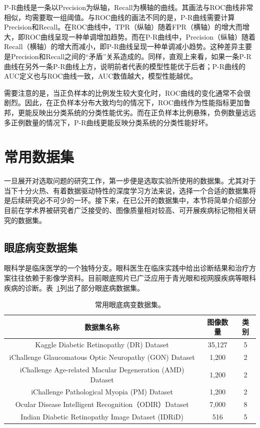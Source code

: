 P-R曲线是一条以Precision为纵轴，Recall为横轴的曲线。其画法与ROC曲线非常相似，均需要取一组阈值。与ROC曲线的画法不同的是，P-R曲线需要计算Precision和Recall。在ROC曲线中，TPR（纵轴）随着FPR（横轴）的增大而增大，即ROC曲线呈现一种单调增加趋势。而在P-R曲线中，Precision（纵轴）随着Recall（横轴）的增大而减小，即P-R曲线呈现一种单调减小趋势。这种差异主要是Precision和Recall之间的“矛盾”关系造成的。同样，直观上来看，如果一条P-R曲线在另外一条P-R曲线上方，说明前者代表的模型性能优于后者；P-R曲线的AUC定义也与ROC曲线一致，AUC数值越大，模型性能越优。

需要注意的是，当正负样本的比例发生较大变化时，ROC曲线的变化通常不会很剧烈。因此，在正负样本分布大致均匀的情况下，ROC曲线作为性能指标更加鲁邦，更能反映出分类系统的分类性能优劣。而在正负样本比例悬殊，负例数量远远多正例数量的情况下，P-R曲线更能反映分类系统的分类性能好坏。
\vspace{-0.3cm}
\section{常用数据集}\label{sec:usually_ds_intro}
一旦展开对选取问题的研究工作，第一步便是选取实验所使用的数据集。尤其对于当下十分火热、有着数据驱动特性的深度学习方法来说，选择一个合适的数据集将是后续研究必不可少的一环。接下来，在已公开的数据集中，本节将简单介绍部分目前在学术界被研究者广泛接受的、图像质量相对较高、可开展疾病标记物相关研究的数据集。

\subsection{眼底病变数据集}\label{subsec:original_dr_dataset_intro}
眼科学是临床医学的一个独特分支。眼科医生在临床实践中给出诊断结果和治疗方案往往依赖于影像学资料。目前眼底照片已广泛应用于青光眼和视网膜疾病等眼科疾病的诊断。表~\ref{tab:datasets_info}列出了部分眼底病数据集。
\begin{table}[h]
	\centering
	\caption[常用眼底病变数据集]{常用眼底病变数据集。}
	\label{tab:datasets_info}
	\begin{tabular}{c|c|c}
		\toprule[2pt]
		数据集名称 & 图像数量 & 类别 \\
		\midrule[2pt]
		Kaggle Diabetic Retinopathy (DR) Dataset	& 35,127	& 5	 \\
		\hline                         
		iChallenge Glaucomatous Optic Neuropathy (GON) Dataset   & 1,200    & 2 \\ \hline
		iChallenge Age-related Macular Degeneration (AMD) Dataset & 1,200    & 2  \\ \hline
		iChallenge Pathological Myopia (PM)   Dataset            & 1,200    & 2 \\ \hline
		Ocular Disease Intelligent Recognition（ODIR）Dataset & 7,000 & 8 \\ \hline
		
		Indian Diabetic Retinopathy Image Dataset (IDRiD) & 516 & 5  \\
		\bottomrule[2pt]
	\end{tabular}
\end{table}

